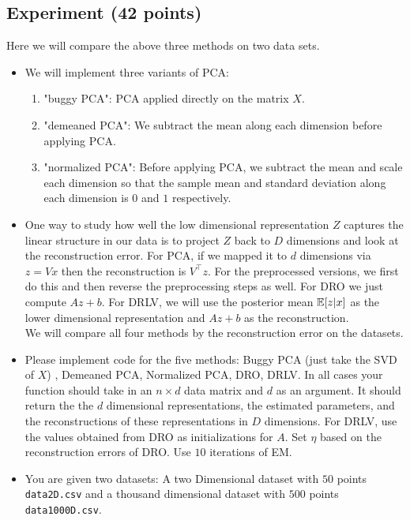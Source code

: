  
\subsection{Experiment (42 points)}

Here we will compare the above three methods on two data sets. 

\begin{itemize}
\item We will implement three variants of PCA:
\begin{enumerate}
    \item "buggy PCA": PCA applied directly on the matrix $X$.
    \item "demeaned PCA": We subtract the mean along each dimension before applying PCA.
    \item "normalized PCA": Before applying PCA, we subtract the mean and scale each dimension so that the sample  mean and standard deviation along each dimension is $0$ and $1$ respectively.
    
\end{enumerate}



\item 
One way to study how well the low dimensional representation $Z$ captures the linear
structure in our data is to project $Z$ back to $D$ dimensions and look at the reconstruction
error. For PCA, if we mapped it to $d$ dimensions via $z = Vx$ then the
reconstruction is $V^\top z$. For the preprocessed versions, we first do this and then
reverse the preprocessing steps as well. For DRO  we just compute $Az + b$.
For DRLV, we will use the posterior mean $\mathbb{E}[z|x]$ as the lower dimensional
representation and $Az + b$ as the reconstruction. \\
We will compare all four methods by the reconstruction error on the datasets.

\item 
Please implement code for the five methods: Buggy PCA (just take the SVD of $X$)
, Demeaned PCA,
Normalized PCA, DRO, DRLV. In all cases your function should take in
an $n \times d$ data matrix and $d$ as an argument. It should return the
the $d$ dimensional representations, the estimated parameters, and the
reconstructions of these representations in $D$ dimensions. 
For DRLV, use the values obtained from DRO as initializations for $A$. Set $\eta$
based on the reconstruction errors of DRO.
Use $10$ iterations of EM.

\item
You are given two datasets: A two Dimensional dataset with $50$ points 
\texttt{data2D.csv} and a thousand dimensional dataset with $500$ points
\texttt{data1000D.csv}. 


\end{itemize}

